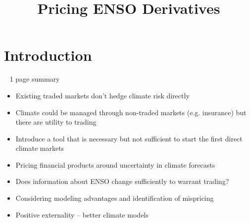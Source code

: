 \documentclass[authoryear]{article}
\begin{document}
\title{Pricing ENSO Derivatives}
\date{}  %
%
%
%
%
%


\maketitle%


\section{Introduction}

~ 1 page summary

\begin{itemize}
\item Existing traded markets don't hedge climate risk directly
\item Climate could be managed through non-traded markets (e.g. insurance) but there are utility to trading
\end{itemize}

\begin{itemize}
\item Introduce a tool that is necessary but not sufficient to start the first direct climate markets
\item Pricing financial products around uncertainty in climate forecasts
\item Does information about ENSO change sufficiently to warrant trading?
\item Considering modeling advantages and identification of mispricing
\item Positive externality – better climate models
\end{itemize}
\end{document}
